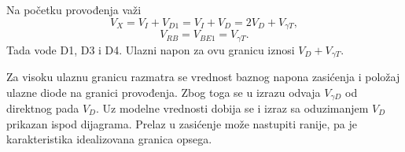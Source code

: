 Na početku provođenja važi
\[V_X=V_I+V_{D1}=V_I+V_D=2V_D+V_{\gamma T},\]
\[V_{RB}=V_{BE1}=V_{\gamma T}.\]
Tada vode D1, D3 i D4. Ulazni napon za ovu granicu iznosi $V_D+V_{\gamma T}$.

Za visoku ulaznu granicu razmatra se vrednost baznog napona zasićenja i položaj ulazne diode na granici provođenja. Zbog toga se u izrazu odvaja $V_{\gamma D}$ od direktnog pada $V_D$. Uz modelne vrednosti dobija se i izraz sa oduzimanjem $V_D$ prikazan ispod dijagrama. Prelaz u zasićenje može nastupiti ranije, pa je karakteristika idealizovana granica opsega.
